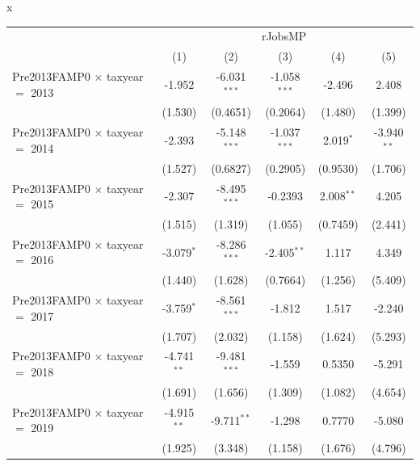x
\begingroup
\centering
\begin{tabular}{lccccc}
   \toprule
    & \multicolumn{5}{c}{rJobsMP}\\
                                           & (1)            & (2)            & (3)            & (4)           & (5)\\  
   \midrule 
   Pre2013FAMP0 $\times$ taxyear $=$ 2013  & -1.952         & -6.031$^{***}$ & -1.058$^{***}$ & -2.496        & 2.408\\   
                                           & (1.530)        & (0.4651)       & (0.2064)       & (1.480)       & (1.399)\\   
   Pre2013FAMP0 $\times$ taxyear $=$ 2014  & -2.393         & -5.148$^{***}$ & -1.037$^{***}$ & 2.019$^{*}$   & -3.940$^{**}$\\   
                                           & (1.527)        & (0.6827)       & (0.2905)       & (0.9530)      & (1.706)\\   
   Pre2013FAMP0 $\times$ taxyear $=$ 2015  & -2.307         & -8.495$^{***}$ & -0.2393        & 2.008$^{**}$  & 4.205\\   
                                           & (1.515)        & (1.319)        & (1.055)        & (0.7459)      & (2.441)\\   
   Pre2013FAMP0 $\times$ taxyear $=$ 2016  & -3.079$^{*}$   & -8.286$^{***}$ & -2.405$^{**}$  & 1.117         & 4.349\\   
                                           & (1.440)        & (1.628)        & (0.7664)       & (1.256)       & (5.409)\\   
   Pre2013FAMP0 $\times$ taxyear $=$ 2017  & -3.759$^{*}$   & -8.561$^{***}$ & -1.812         & 1.517         & -2.240\\   
                                           & (1.707)        & (2.032)        & (1.158)        & (1.624)       & (5.293)\\   
   Pre2013FAMP0 $\times$ taxyear $=$ 2018  & -4.741$^{**}$  & -9.481$^{***}$ & -1.559         & 0.5350        & -5.291\\   
                                           & (1.691)        & (1.656)        & (1.309)        & (1.082)       & (4.654)\\   
   Pre2013FAMP0 $\times$ taxyear $=$ 2019  & -4.915$^{**}$  & -9.711$^{**}$  & -1.298         & 0.7770        & -5.080\\   
                                           & (1.925)        & (3.348)        & (1.158)        & (1.676)       & (4.796)\\   

\end{tabular}
